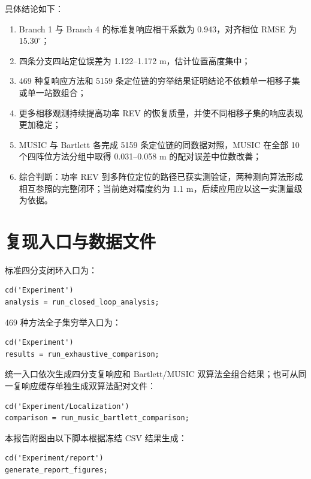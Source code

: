 \documentclass[UTF8,12pt,a4paper]{ctexart}
\begin{document}
具体结论如下：

\begin{enumerate}
  \item Branch 1 与 Branch 4 的标准复响应相干系数为 0.943，对齐相位 RMSE 为 $15.30^\circ$；
  \item 四条分支四站定位误差为 1.122--1.172 m，估计位置高度集中；
  \item 469 种复响应方法和 5159 条定位链的穷举结果证明结论不依赖单一相移子集或单一站数组合；
  \item 更多相移观测持续提高功率 REV 的恢复质量，并使不同相移子集的响应表现更加稳定；
  \item MUSIC 与 Bartlett 各完成 5159 条定位链的同数据对照，MUSIC 在全部 10 个四阵位方法分组中取得 0.031--0.058 m 的配对误差中位数改善；
  \item 综合判断：功率 REV 到多阵位定位的路径已获实测验证，两种测向算法形成相互参照的完整闭环；当前绝对精度约为 1.1 m，后续应用应以这一实测量级为依据。
\end{enumerate}

\clearpage
\section{复现入口与数据文件}

标准四分支闭环入口为：
\begin{verbatim}
cd('Experiment')
analysis = run_closed_loop_analysis;
\end{verbatim}

469 种方法全子集穷举入口为：
\begin{verbatim}
cd('Experiment')
results = run_exhaustive_comparison;
\end{verbatim}

统一入口依次生成四分支复响应和 Bartlett/MUSIC 双算法全组合结果；也可从同一复响应缓存单独生成双算法配对文件：
\begin{verbatim}
cd('Experiment/Localization')
comparison = run_music_bartlett_comparison;
\end{verbatim}

本报告附图由以下脚本根据冻结 CSV 结果生成：
\begin{verbatim}
cd('Experiment/report')
generate_report_figures;
\end{verbatim}
\end{document}
